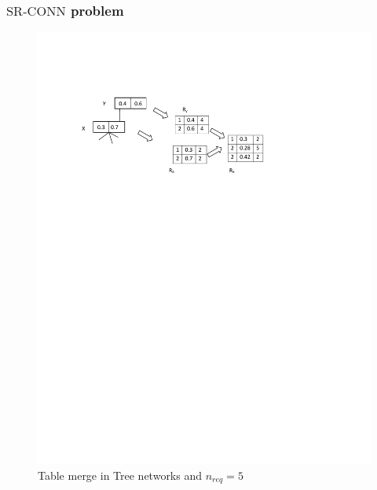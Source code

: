 \documentclass{beamer}
\newcommand{\SRCONN}   { {\mathrm {SR\mbox{-}CONN}} }
\begin{document}
\begin{frame}
\frametitle{$\SRCONN$ problem}
\begin{figure}
\includegraphics[scale=1]{Tree.pdf}
\caption{Table merge in Tree networks and $n_{req}=5$}
\end{figure}
\end{frame}
\end{document}
